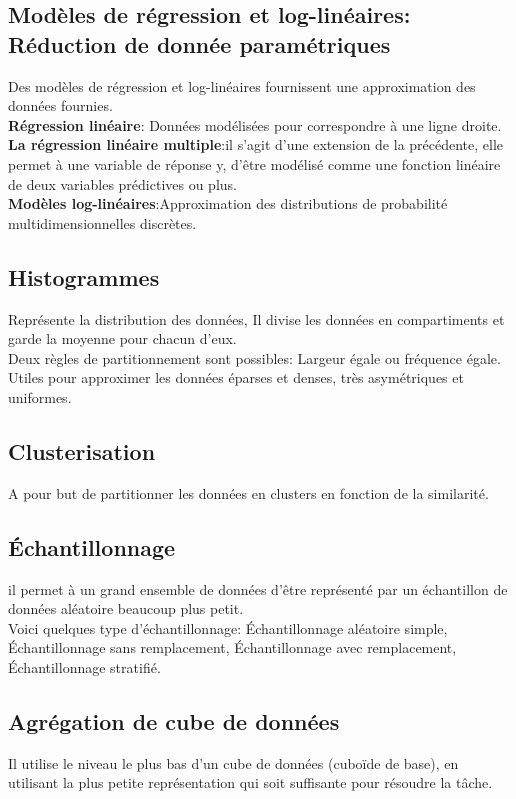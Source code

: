 \documentclass[12pt,a4paper,oneside]{book}
\begin{document}
\subsection{Modèles de régression et log-linéaires: Réduction de donnée paramétriques}
Des modèles de régression et log-linéaires fournissent une approximation des données fournies.\\
\textbf{Régression linéaire}: Données modélisées pour correspondre à une ligne droite.\\
\textbf{La régression linéaire multiple}:il s'agit d'une extension de la précédente, elle permet à une variable de réponse y, d'être modélisé comme une fonction linéaire de deux variables prédictives ou plus.\\
\textbf{Modèles log-linéaires}:Approximation des distributions de probabilité multidimensionnelles discrètes.

\subsection{Histogrammes}
Représente la distribution des données, Il divise les données en compartiments et garde la moyenne pour chacun d'eux.\\
Deux règles de partitionnement sont possibles: Largeur égale ou fréquence égale.\\
Utiles pour approximer les données éparses et denses, très asymétriques et uniformes.

\subsection{Clusterisation}
A pour but de partitionner les données en clusters en fonction de la similarité.

\subsection{Échantillonnage}
il permet à un grand ensemble de données d'être représenté par un échantillon de données aléatoire beaucoup plus petit.\\
Voici quelques type d'échantillonnage: Échantillonnage aléatoire simple, Échantillonnage sans remplacement, Échantillonnage avec remplacement, Échantillonnage stratifié.

\subsection{Agrégation de cube de données}
Il utilise le niveau le plus bas d'un cube de données (cuboïde de base), en utilisant la plus petite représentation qui soit suffisante pour résoudre la tâche.
\end{document}
